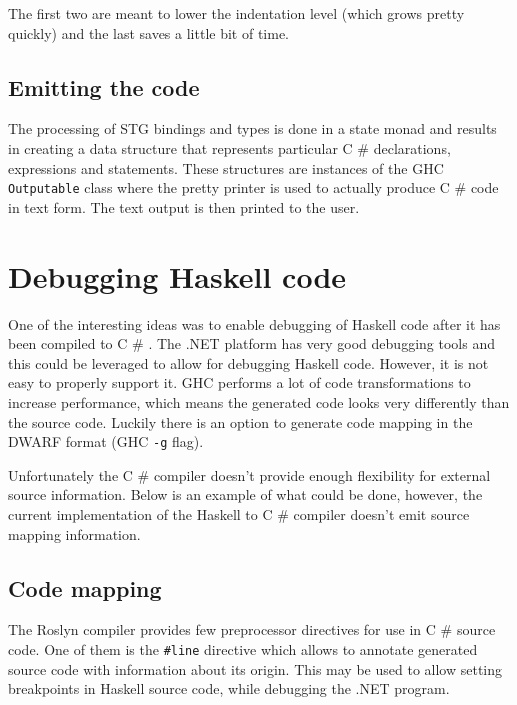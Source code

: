 \documentclass[en]{pracamgr}
\newcommand{\shrp}{%
  {\fontfamily{ppl}\selectfont\#%
  }}
\begin{document}
The first two are meant to lower the indentation level (which grows pretty quickly) and the last saves
a little bit of time.

\subsection{Emitting the code}
The processing of STG bindings and types is done in a state monad and results in creating a data 
structure that represents particular C\shrp{} declarations, expressions and statements.
These structures are instances of the GHC \texttt{Outputable} class where the pretty printer
is used to actually produce C\shrp{} code in text form. The text output is then printed to the user.

\section{Debugging Haskell code}
One of the interesting ideas was to enable debugging of Haskell code
after it has been compiled to C\shrp{}. The .NET platform has very good debugging
tools and this could be leveraged to allow for debugging Haskell code.
However, it is not easy to properly support it.
GHC performs a lot of code transformations to increase performance,
which means the generated code looks very differently than the source code.
Luckily there is an option to generate code mapping in the DWARF format (GHC \verb|-g| flag).

Unfortunately the C\shrp{} compiler doesn't provide enough flexibility for external source information.
Below is an example of what could be done, however, the current implementation of the Haskell
to C\shrp{} compiler doesn't emit source mapping information.

\subsection{Code mapping}
The Roslyn compiler provides few preprocessor directives for use in C\shrp{} source code.
One of them is the \verb|#line| directive which allows to annotate generated source code
with information about its origin. This may be used to allow setting breakpoints in Haskell
source code, while debugging the .NET program.
\end{document}
